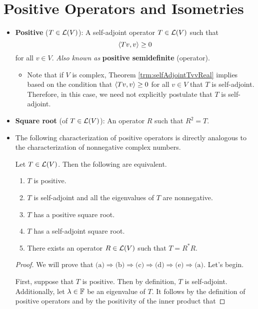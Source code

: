 \documentclass[../main.tex]{subfiles}
\begin{document}
\section{Positive Operators and Isometries}
\begin{itemize}
    \item {}\textbf{Positive} ($T\in\mathcal{L}(V)$): A self-adjoint operator $T\in\mathcal{L}(V)$ such that
    \begin{equation*}
        \left\langle{Tv},{v}\right\rangle \geq 0
    \end{equation*}
    for all $v\in V$. \emph{Also known as} \textbf{positive semidefinite} (operator).
    \begin{itemize}
        \item Note that if $V$ is complex, Theorem \ref{trm:selfAdjointTvvReal} implies based on the condition that $\left\langle{Tv},{v}\right\rangle\geq 0$ for all $v\in V$ that $T$ is self-adjoint. Therefore, in this case, we need not explicitly postulate that $T$ is self-adjoint.
    \end{itemize}
    \item \textbf{Square root} (of $T\in\mathcal{L}(V)$): An operator $R$ such that $R^2=T$.
    \item The following characterization of positive operators is directly analogous to the characterization of nonnegative complex numbers.
    \begin{theorem}\label{trm:positiveConditions}
        Let $T\in\mathcal{L}(V)$. Then the following are equivalent.
        \begin{enumerate}[label={\textup{(}\alph*\textup{)}}]
            \item $T$ is positive.
            \item $T$ is self-adjoint and all the eigenvalues of $T$ are nonnegative.
            \item $T$ has a positive square root.
            \item $T$ has a self-adjoint square root.
            \item There exists an operator $R\in\mathcal{L}(V)$ such that $T=R^*R$.
        \end{enumerate}
        \begin{proof}
            We will prove that $\text{(a)}\Rightarrow\text{(b)}\Rightarrow\text{(c)}\Rightarrow\text{(d)}\Rightarrow\text{(e)}\Rightarrow\text{(a)}$. Let's begin.\par\smallskip
            First, suppose that $T$ is positive. Then by definition, $T$ is self-adjoint. Additionally, let $\lambda\in\mathbb{F}$ be an eigenvalue of $T$. It follows by the definition of positive operators and by the positivity of the inner product that

\end{proof}
\end{theorem}
\end{itemize}
\end{document}
